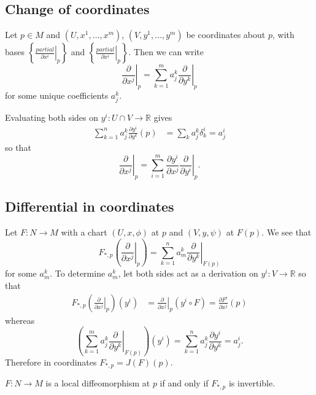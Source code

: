 \subsection{Change of coordinates}
Let $p \in M$ and $(U, x^1, \dots, x^m)$, $(V, y^1, \dots, y^m)$ be
coordinates about $p$, with bases
$
\left\{
  \left.
    \frac{partial}{\partial x^i}
  \right|_p
\right\}
$ and
$
\left\{
  \left.
    \frac{partial}{\partial x^i}
  \right|_p
\right\}
$. Then we can write
$$
  \left.
    \frac{\partial}{\partial x^j}
  \right|_p
= \sum_{k=1}^m
    a_j^k
    \left.\frac{\partial}{\partial y^k}\right|_p
$$
for some unique coefficients $a_j^k$.

Evaluating both sides on $y^i: U \cap V \to \mathbb{R}$ gives
\begin{align*}
   \sum_{k=1}^n
     a_j^k
     \frac{\partial y^i}{\partial y^k}(p)
&= \sum_k a_j^k \delta_k^i = a_j^i
\end{align*}
so that
$$
  \left.\frac{\partial}{\partial x^j}\right|_p
= \sum_{i=1}^m
    \frac{\partial y^i}{\partial x^j}
    \left.
      \frac{\partial}{\partial y^i}
    \right|_p.
$$

\subsection{Differential in coordinates}
Let $F: N \to M$ with a chart $(U, x, \phi)$ at
$p$ and $(V, y, \psi)$ at $F(p)$. We see that
$$
  F_{\ast,p}
  \left(
    \left.
      \frac{\partial}{\partial x^j}
    \right|_p
  \right)
= \sum_{k=1}^n
    a_m^k
    \left.
      \frac{\partial}{\partial y^k}
    \right|_{F(p)}
$$
for some $a_m^k$. To determine $a_m^k$, let both sides act as a
derivation on $y^i: V \to \mathbb{R}$ so that
\begin{align*}
   F_{\ast, p}
     \left(
       \left.
         \frac{\partial}{\partial x^j}
       \right|_p
     \right)(y^i)
&= \left.
     \frac{\partial}{\partial x^j}
   \right|_p
     (y^i \circ F)
 = \frac{\partial F^i}{\partial x^j}(p)
\end{align*}
whereas
$$
  \left(
    \sum_{k=1}^m
      a_j^k
      \left.
        \frac{\partial}{\partial y^k}
      \right|_{F(p)}
  \right)
    (y^i)
= \sum_{k=1}^n
    a_j^k
    \frac{\partial y^i}{\partial y^k}
= a^i_j.
$$
Therefore in coordinates $F_{\ast,p} = J(F)(p).$

\begin{theorem}
$F: N \to M$ is a local diffeomorphism at $p$ if and only if
$F_{\ast,p}$ is invertible.
\end{theorem}

